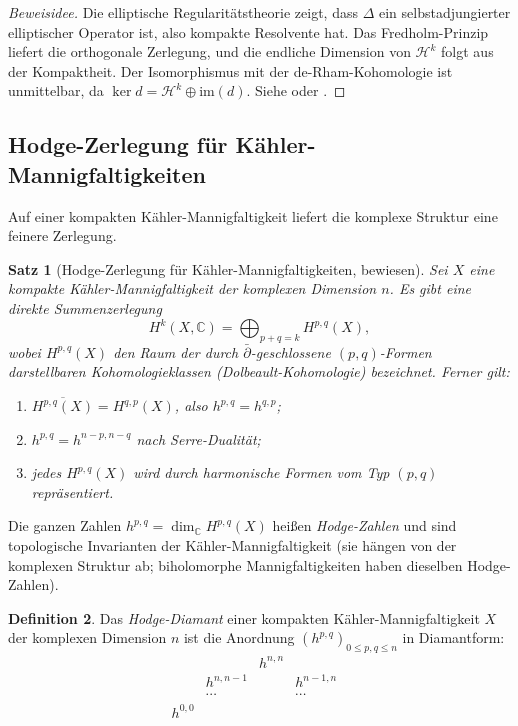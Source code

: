 \documentclass[12pt,a4paper]{amsart}
\newtheorem{theorem}{Satz}[section]
\theoremstyle{definition}
\newtheorem{definition}[theorem]{Definition}
\theoremstyle{remark}
\begin{document}
\begin{proof}[Beweisidee]
Die elliptische Regularitätstheorie zeigt, dass $\Delta$ ein selbstadjungierter
elliptischer Operator ist, also kompakte Resolvente hat. Das Fredholm-Prinzip liefert
die orthogonale Zerlegung, und die endliche Dimension von $\mathcal{H}^k$ folgt aus
der Kompaktheit. Der Isomorphismus mit der de-Rham-Kohomologie ist unmittelbar, da
$\ker d = \mathcal{H}^k \oplus \mathrm{im}(d)$.
Siehe \cite[Kap.~0]{griffiths_harris1978} oder \cite[Kap.~4]{warner1983}.
\end{proof}

\subsection{Hodge-Zerlegung für Kähler-Mannigfaltigkeiten}

Auf einer kompakten Kähler-Mannigfaltigkeit liefert die komplexe Struktur eine feinere
Zerlegung.

\begin{theorem}[Hodge-Zerlegung für Kähler-Mannigfaltigkeiten, bewiesen]
\label{thm:hodge-kahler}
Sei $X$ eine kompakte Kähler-Mannigfaltigkeit der komplexen Dimension $n$. Es gibt eine
direkte Summenzerlegung
\[
  H^k(X, \mathbb{C}) = \bigoplus_{p+q=k} H^{p,q}(X),
\]
wobei $H^{p,q}(X)$ den Raum der durch $\bar\partial$-geschlossene $(p,q)$-Formen
darstellbaren Kohomologieklassen (Dolbeault-Kohomologie) bezeichnet. Ferner gilt:
\begin{enumerate}[label=(\roman*)]
\item $\overline{H^{p,q}(X)} = H^{q,p}(X)$, also $h^{p,q} = h^{q,p}$;
\item $h^{p,q} = h^{n-p,n-q}$ nach Serre-Dualität;
\item jedes $H^{p,q}(X)$ wird durch harmonische Formen vom Typ $(p,q)$ repräsentiert.
\end{enumerate}
\end{theorem}

Die ganzen Zahlen $h^{p,q} = \dim_{\mathbb{C}} H^{p,q}(X)$ heißen \emph{Hodge-Zahlen}
und sind topologische Invarianten der Kähler-Mannigfaltigkeit (sie hängen von der
komplexen Struktur ab; biholomorphe Mannigfaltigkeiten haben dieselben Hodge-Zahlen).

\begin{definition}
Das \emph{Hodge-Diamant} einer kompakten Kähler-Mannigfaltigkeit $X$ der komplexen
Dimension $n$ ist die Anordnung $(h^{p,q})_{0 \le p,q \le n}$ in Diamantform:
\[
\begin{array}{ccccc}
  & & h^{n,n} & & \\
  & h^{n,n-1} & & h^{n-1,n} & \\
  & \cdots & & \cdots & \\
  h^{0,0} & & & & \\
\end{array}
\]
\end{definition}
\end{document}
